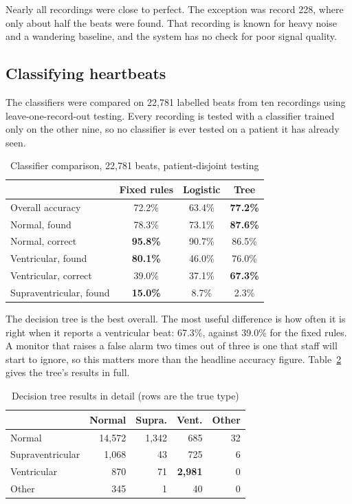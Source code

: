 \documentclass[conference]{IEEEtran}
\begin{document}
Nearly all recordings were close to perfect. The exception was record 228, where
only about half the beats were found. That recording is known for heavy noise and
a wandering baseline, and the system has no check for poor signal quality.

\subsection{Classifying heartbeats}

The classifiers were compared on 22{,}781 labelled beats from ten recordings
using leave-one-record-out testing. Every recording is tested with a classifier
trained only on the other nine, so no classifier is ever tested on a patient it
has already seen.

\begin{table}[!t]
\caption{Classifier comparison, 22{,}781 beats, patient-disjoint testing}
\label{tab:classifiers}
\centering
\footnotesize
\begin{tabular}{@{}lccc@{}}
\toprule
& \textbf{Fixed rules} & \textbf{Logistic} & \textbf{Tree} \\
\midrule
Overall accuracy        & 72.2\% & 63.4\% & \textbf{77.2\%} \\
\midrule
Normal, found           & 78.3\% & 73.1\% & \textbf{87.6\%} \\
Normal, correct         & \textbf{95.8\%} & 90.7\% & 86.5\% \\
\midrule
Ventricular, found      & \textbf{80.1\%} & 46.0\% & 76.0\% \\
Ventricular, correct    & 39.0\% & 37.1\% & \textbf{67.3\%} \\
\midrule
Supraventricular, found & \textbf{15.0\%} & 8.7\% & 2.3\% \\
\bottomrule
\end{tabular}
\end{table}

The decision tree is the best overall. The most useful difference is how often it
is right when it reports a ventricular beat: 67.3\%, against 39.0\% for the fixed
rules. A monitor that raises a false alarm two times out of three is one that
staff will start to ignore, so this matters more than the headline accuracy
figure. Table~\ref{tab:confusion} gives the tree's results in full.

\begin{table}[!t]
\caption{Decision tree results in detail (rows are the true type)}
\label{tab:confusion}
\centering
\footnotesize
\begin{tabular}{@{}lrrrr@{}}
\toprule
& \textbf{Normal} & \textbf{Supra.} & \textbf{Vent.} & \textbf{Other} \\
\midrule
Normal           & 14{,}572 & 1{,}342 & 685 & 32 \\
Supraventricular & 1{,}068  & 43      & 725 & 6 \\
Ventricular      & 870      & 71      & \textbf{2{,}981} & 0 \\
Other            & 345      & 1       & 40  & 0 \\
\bottomrule
\end{tabular}
\end{table}
\end{document}
